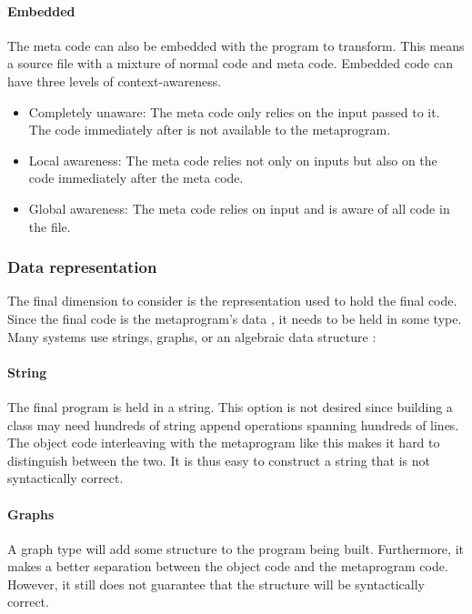 \paragraph{Embedded}
The meta code can also be embedded with the program to transform.
This means a source file with a mixture of normal code and meta code.
Embedded code can have three levels of context-awareness. \cite{savidis_19_01}

\begin{itemize}
	\item Completely unaware: The meta code only relies on the input passed to it.
	      The code immediately after is not available to the metaprogram.
	\item Local awareness: The meta code relies not only on inputs but also on the code immediately after the meta code.
	\item Global awareness: The meta code relies on input and is aware of all code in the file.
\end{itemize}

\subsubsection{Data representation}
The final dimension to consider is the representation used to hold the final code.
Since the final code is the metaprogram's data \cite{bawden_99_01}, it needs to be held in some type.
Many systems use strings, graphs, or an algebraic data structure \cite{sheard_01_01}:

\paragraph{String}
The final program is held in a string.
This option is not desired since building a class may need hundreds of string append operations spanning hundreds of lines.
The object code interleaving with the metaprogram like this makes it hard to distinguish between the two.
It is thus easy to construct a string that is not syntactically correct.

\paragraph{Graphs}
A graph type will add some structure to the program being built.
Furthermore, it makes a better separation between the object code and the metaprogram code.
However, it still does not guarantee that the structure will be syntactically correct.

